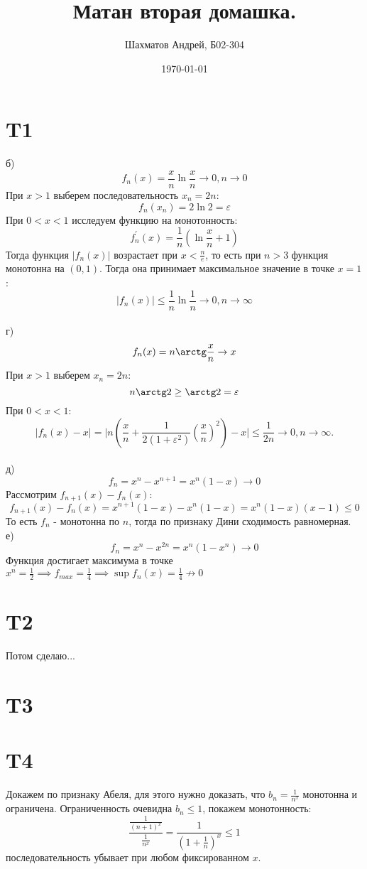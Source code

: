 \documentclass[12pt]{article}
\title{Матан вторая домашка.}
\author{Шахматов Андрей, Б02-304}
\date{\today}
\begin{document}
\maketitle
\tableofcontents

\section{T1}
б)
\[
    f_n(x) = \frac{x}{n} \ln \frac{x}{n} \to 0, n \to 0
\]
При $x > 1$ выберем последовательность $x_n = 2n$: 
\[
    f_n(x_n) = 2 \ln 2 = \varepsilon
\]
При $0 < x < 1$ исследуем функцию на монотонность: 
\[
    f_n^{\prime}(x) = \frac{1}{n} \left( \ln \frac{x}{n} + 1 \right) 
\] 
Тогда функция $\vert f_n(x) \vert $ возрастает при $x < \frac{n}{e}$, то есть при $n > 3$ функция 
монотонна на $(0, 1)$. Тогда она принимает максимальное значение в точке $x = 1$: 
\[
    \vert f_n(x) \vert \leq \frac{1}{n} \ln \frac{1}{n} \to 0, n \to \infty
\]
\\г)
\[
    f_n(x) = n \arctg \frac{x}{n} \to x
\]
При $x > 1$ выберем $x_n = 2n$: 
\[
    n \arctg 2 \geq \arctg 2 = \varepsilon 
\]  
При $0 < x < 1$: 
\[
    \vert f_n(x) - x \vert = \vert n(\frac{x}{n} + \frac{1}{2(1 + \varepsilon^2)} (\frac{x}{n})^2) - x \vert \leq \frac{1}{2n} \to 0, n \to \infty.   
\]
\\д) 
\[
    f_n = x^n - x^{n+1} = x^n(1 - x) \to 0 
\]
Рассмотрим $f_{n+1}(x) - f_n(x)$: 
\[
    f_{n+1}(x) - f_n(x) = x^{n+1}(1 - x) - x^n(1 - x) = x^n(1 - x)(x - 1) \leq 0  
\] 
То есть $f_n$ - монотонна по $n$, тогда по признаку Дини сходимость равномерная. 
\\е)
\[
    f_n = x^n - x^{2n} = x^n(1 - x^n) \to 0 
\]
Функция достигает максимума в точке $x^n = \frac{1}{2} \implies f_{max} = \frac{1}{4} \implies \sup f_n(x) = \frac{1}{4} \not \to 0$ 
\section{T2}
Потом сделаю... 
\section{T3}
\section{T4}
Докажем по признаку Абеля, для этого нужно доказать, что $b_n = \frac{1}{n^x}$ монотонна и ограничена. 
Ограниченность очевидна $b_n \leq 1$, покажем монотонность: 
\[
    \frac{\frac{1}{(n+1)^x}}{\frac{1}{n^x}} = \frac{1}{\left( 1 + \frac{1}{n} \right)^x } \leq 1 
\] 
последовательность убывает при любом фиксированном $x$. 
\end{document}
